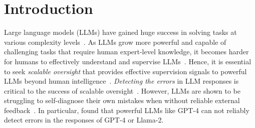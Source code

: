 \documentclass{article} %
\newcommand{\yq}[1]{\textcolor{darkred}{#1}}
\begin{document}
\section{Introduction}





Large language models (LLMs) have gained huge success in solving tasks at various complexity levels~\citep{spark_AGI,o1,r1}.
As LLMs grow more powerful and capable of challenging tasks that require human expert-level knowledge, it becomes harder for humans to effectively understand and supervise LLMs~\citep{amodei2016concrete}.
Hence, it is essential to seek \textit{scalable oversight} that provides effective supervision signals to powerful LLMs beyond human intelligence~\citep{amodei2016concrete,christiano2018supervising,irving2018ai,bowman2022measuring,burns2023weaktostrong,khan2024debating,kenton2024on}.
\textit{Detecting the errors} in LLM responses is critical to the success of scalable oversight~\citep{tyen2024cannotfind,huang2024cannotselfcorrect,kamoi2024self-correction}.
However, LLMs are shown to be struggling to self-diagnose their own mistakes when without reliable external feedback~\citep{kamoi2024self-correction}.
In particular, \citet{realmistake} found that powerful LLMs like GPT-4 can not reliably detect errors in the responses of GPT-4 or Llama-2.
\end{document}
